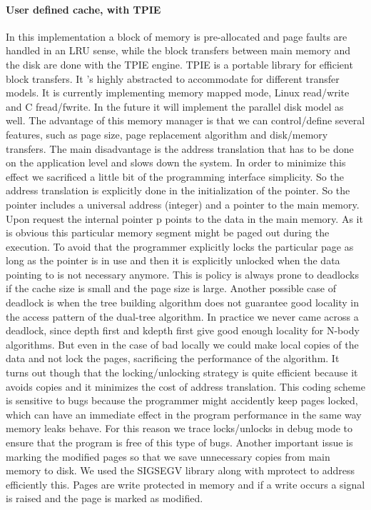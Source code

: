 \documentclass[12pt,letterpaper,doublespaced,ETD,dvips,proposal]{gtthesis}
\begin{document}
\begin{Body}
\paragraph{User defined cache, with TPIE} In this implementation a block of
memory is pre-allocated and page faults are handled in an LRU sense,
while the block transfers between main memory and the disk are done
with the TPIE engine. TPIE is a portable library for efficient block
transfers. It 's highly abstracted to accommodate for different
transfer models. It is currently implementing memory mapped mode,
Linux read/write and C fread/fwrite. In the future it will implement
the parallel disk model as well. The advantage of this memory
manager is that we can control/define several features, such as page
size, page replacement algorithm and disk/memory transfers. The main
disadvantage is the address translation that has to be done on the
application level and slows down the system. In order to minimize
this effect we sacrificed a little bit of the programming interface
simplicity. So the address translation is explicitly done in the
initialization of the pointer. So the pointer includes a universal
address (integer) and a pointer to the main memory. Upon request the
internal pointer p points to the data in the main memory. As it is
obvious this particular memory segment might be paged out during the
execution. To avoid that the programmer explicitly locks the
particular page as long as the pointer is in use and then it is
explicitly unlocked when the data pointing to is not necessary
anymore. This is  policy is always prone to deadlocks if the cache
size is small and the page size is large. Another possible case of
deadlock is when the tree building algorithm does not guarantee good
locality in the access pattern of the dual-tree algorithm. In
practice we never came across a deadlock, since depth first and
kdepth first give good enough locality for N-body algorithms. But
even in the case of bad locally we could make local copies of the
data and not lock the pages, sacrificing the performance of the
algorithm. It turns out though that the locking/unlocking strategy
is quite efficient because it avoids copies and it minimizes the
cost of address translation. This coding scheme is sensitive to bugs
because the programmer might accidently keep pages locked, which can
have an immediate effect in the program performance in the same way
memory leaks behave. For this reason we trace locks/unlocks in debug
mode to ensure that the program is free of this type of bugs.
Another important issue is marking the modified pages so that we
save unnecessary copies from main memory to disk. We used the
SIGSEGV library along with mprotect to address efficiently this.
Pages are write protected in memory and if a write occurs a signal
is raised and the page is marked as modified.


\end{Body}
\end{document}
